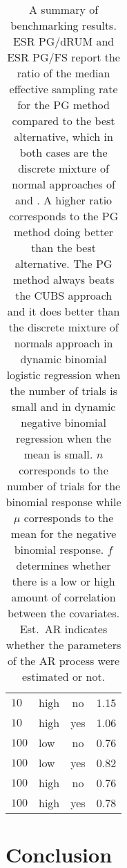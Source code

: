 \documentclass[11pt]{article}
\begin{document}
\begin{table}
\begin{tabular}{l l c c}
$10$ & high & no & 1.15 \\
$10$ & high & yes & 1.06 \\

$100$ & low & no & 0.76 \\
$100$ & low & yes & 0.82 \\

$100$ & high & no & 0.76 \\
$100$ & high & yes & 0.78 \\

\end{tabular}

\caption{\label{tab:benchmark-summary} A summary of benchmarking results. ESR
  PG/dRUM 
  and ESR PG/FS report the ratio of
  the median effective sampling rate for the PG method compared to the best
  alternative, which in both cases are the discrete mixture of normal approaches
  of \cite{fussl-etal-2013} and \cite{fruhwirth-schnatter-etal-2009}.  A higher
  ratio corresponds to the PG method doing better than the best alternative.  The
  PG method always beats the CUBS approach and it does better than the discrete
  mixture of normals approach in dynamic binomial logistic regression when the number of
  trials is small and in dynamic negative binomial regression when the 
  mean is small.  $n$ corresponds to the number of trials for the binomial
  response while $\mu$ corresponds to the mean for the negative binomial
  response.  $f$ determines whether there is a low or high amount of correlation
  between the covariates.  Est.\ AR indicates whether the parameters of the AR
  process were estimated or not.
}
\end{table}



\section{Conclusion}
\end{document}
